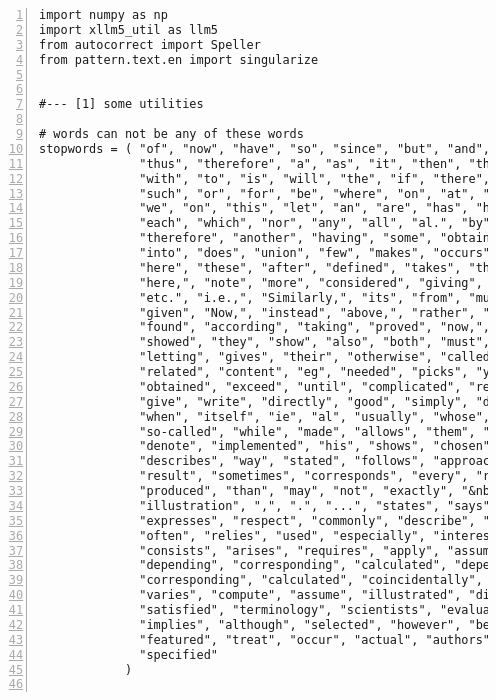 \documentclass[oneside,10pt]{book}
\begin{document}
\begin{lstlisting}[numbers=left]
import numpy as np
import xllm5_util as llm5  
from autocorrect import Speller
from pattern.text.en import singularize


#--- [1] some utilities

# words can not be any of these words
stopwords = ( "of", "now", "have", "so", "since", "but", "and", 
              "thus", "therefore", "a", "as", "it", "then", "that",
              "with", "to", "is", "will", "the", "if", "there", "then,",
              "such", "or", "for", "be", "where", "on", "at", "in", "can",
              "we", "on", "this", "let", "an", "are", "has", "how", "do",
              "each", "which", "nor", "any", "all", "al.", "by", "having",
              "therefore", "another", "having", "some", "obtaining",
              "into", "does", "union", "few", "makes", "occurs", "were",
              "here", "these", "after", "defined", "takes", "therefore,",
              "here,", "note", "more", "considered", "giving", "associated", 
              "etc.", "i.e.,", "Similarly,", "its", "from", "much", "was",
              "given", "Now,", "instead", "above,", "rather", "consider",
              "found", "according", "taking", "proved", "now,", "define",
              "showed", "they", "show", "also", "both", "must", "about",
              "letting", "gives", "their", "otherwise", "called", "descibed",
              "related", "content", "eg", "needed", "picks", "yielding",
              "obtained", "exceed", "until", "complicated", "resulting",
              "give", "write", "directly", "good", "simply", "direction",
              "when", "itself", "ie", "al", "usually", "whose", "being",
              "so-called", "while", "made", "allows", "them", "would", "keeping",
              "denote", "implemented", "his", "shows", "chosen", "just",
              "describes", "way", "stated", "follows", "approaches", "known",
              "result", "sometimes", "corresponds", "every", "referred",
              "produced", "than", "may", "not", "exactly", "&nbsp;", "whether",
              "illustration", ",", ".", "...", "states", "says", "known", "exists",
              "expresses", "respect", "commonly", "describe", "determine", "refer",
              "often", "relies", "used", "especially", "interesting", "versus",
              "consists", "arises", "requires", "apply", "assuming", "said",
              "depending", "corresponding", "calculated", "depending", "associated",
              "corresponding", "calculated", "coincidentally", "becoming", "discussion",
              "varies", "compute", "assume", "illustrated", "discusses", "notes",
              "satisfied", "terminology", "scientists", "evaluate", "include", "call",
              "implies", "although", "selected", "however", "between", "explaining",
              "featured", "treat", "occur", "actual", "authors", "slightly",
              "specified"
            )


\end{lstlisting}
\end{document}
